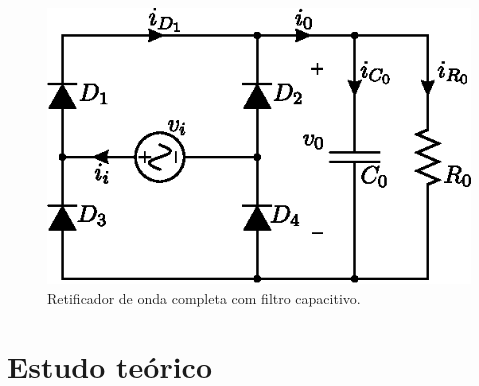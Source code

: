 \begin{figure}[!hb]
	\centering
	\includegraphics[width=0.65\linewidth]{Figs/RetOndaCompletaRC}
	\caption{Retificador de onda completa com filtro capacitivo.}
	\label{fig:retondacompletarc}
\end{figure}






\section{Estudo teórico}

